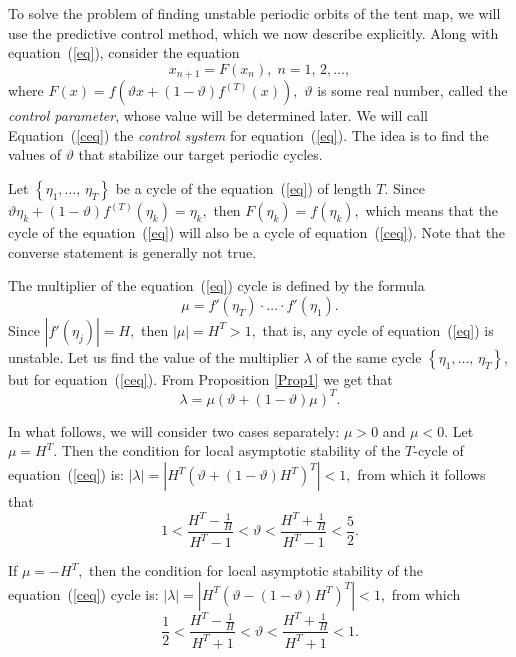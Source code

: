 \documentclass[12pt,a4paper]{amsart}
\begin{document}
To solve the problem of finding unstable periodic orbits of the tent map, we will use the predictive control method, which we now describe explicitly.  Along with equation~(\ref{eq}), consider the equation
\begin{equation}\label{ceq}
x_{n+1}=F(x_n),\;n=1,\,2,\ldots,
\end{equation}
where $F(x)=f\left(\vartheta x + (1-\vartheta)f^{(T)}(x)\right),$ $\vartheta$ is some real number, called the {\it control parameter}, whose value will be determined later.
We will call Equation~(\ref{ceq})  the {\it control system} for equation~(\ref{eq}). The idea is to find the values of $\vartheta$ that stabilize our target periodic cycles.

Let $\left\{\eta_1,\ldots,\,\eta_T\right\}$ be a cycle of  the equation~(\ref{eq}) of length $T$. Since $\vartheta \eta_k + (1-\vartheta)f^{(T)}(\eta_k)=\eta_k,$ then 
$F(\eta_k)=f(\eta_k),$ which means that the cycle of the equation~(\ref{eq}) will also be a cycle of equation~(\ref{ceq}). Note that the converse statement 
is generally not true. 

The multiplier of the equation~(\ref{eq}) cycle is defined by the formula
$$
\mu = f'(\eta_T)\cdot\ldots\cdot f'(\eta_1). 
$$
Since $\left|f'(\eta_j)\right|=H,$ then $|\mu|=H^T>1,$ that is, any cycle of equation~(\ref{eq}) is unstable. Let us find the value of the multiplier 
$\lambda$ of the same cycle $\left\{\eta_1,\ldots,\,\eta_T\right\},$ but for equation~(\ref{ceq}). From Proposition \ref{Prop1} we get that 
$$
\lambda=\mu \left(\vartheta+(1-\vartheta)\mu\right)^T. 
$$

In what follows, we will consider two cases separately: $\mu>0$ and $\mu<0.$ Let $\mu=H^T.$ Then the condition for local asymptotic stability 
of the $T$-cycle of equation~(\ref{ceq}) is: $|\lambda|=\left|H^T \left(\vartheta + (1-\vartheta)H^T\right)^T\right|<1,$ 
from which it follows that 
\begin{equation}\label{inp}
1<
\frac{H^T-\frac{1}{H}}{H^T-1}<
\vartheta<
\frac{H^T+\frac{1}{H}}{H^T-1}<
\frac52.
\end{equation}

If $\mu=-H^T,$ then the condition for local asymptotic stability of the equation~(\ref{ceq}) cycle is: 
$|\lambda|=\left|H^T \left(\vartheta - (1-\vartheta)H^T\right)^T\right|<1,$
from which 
\begin{equation}\label{inn}
\frac12<
\frac{H^T-\frac{1}{H}}{H^T+1}<
\vartheta<
\frac{H^T+\frac{1}{H}}{H^T+1}<
1.
\end{equation}
\end{document}
